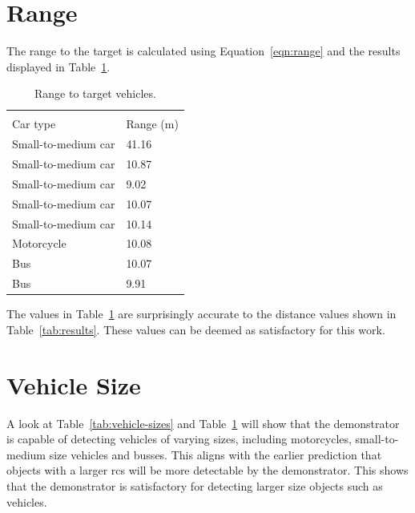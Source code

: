 \documentclass[class=report,11pt,crop=false]{standalone}
\begin{document}
\section{Range}
The range to the target is calculated using Equation~\ref{eqn:range} and the results displayed in Table~\ref{tab:range}.
\begin{table}[!htp]
\centering
\caption{\label{tab:range} Range to target vehicles.}
\vspace{-0.5cm}
\begin{tabular}{|m{5em}|m{5em}|}
\multicolumn{2}{l}{}\\
\cline{1-2}
Car type & Range (m) \\ \cline{1-2}
Small-to-medium car  & 41.16\\ \cline{1-2}
Small-to-medium car   & 10.87 \\ \cline{1-2}
Small-to-medium car   &  9.02\\ \cline{1-2}
Small-to-medium car   & 10.07\\ \cline{1-2}
Small-to-medium car   & 10.14\\ \cline{1-2}
Motorcycle  &  10.08\\ \cline{1-2}
Bus   & 10.07\\ \cline{1-2}
Bus   & 9.91\\ \cline{1-2}
\end{tabular}
\end{table}
The values in Table~\ref{tab:range} are surprisingly accurate to the distance values shown in Table~\ref{tab:results}. These values can be deemed as satisfactory for this work.

\section{Vehicle Size}
A look at Table~\ref{tab:vehicle-sizes} and Table~\ref{tab:range} will show that the demonstrator is capable of detecting vehicles of varying sizes, including motorcycles, small-to-medium size vehicles and busses. This aligns with the earlier prediction that objects with a larger \gls{rcs} will be more detectable by the demonstrator. This shows that the demonstrator is satisfactory for detecting larger size objects such as vehicles.
\ifstandalone

\printnoidxglossary[type=\acronymtype,nonumberlist]
\fi
\end{document}
